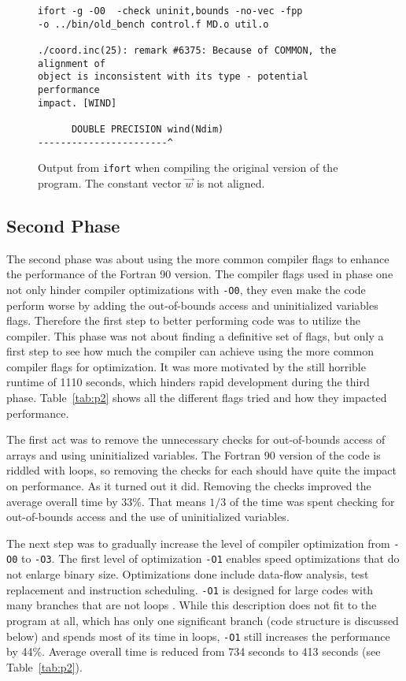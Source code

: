 \documentclass[twoside,11pt]{article}
\begin{document}
\begin{figure}
\begin{verbatim}
ifort -g -O0  -check uninit,bounds -no-vec -fpp
-o ../bin/old_bench control.f MD.o util.o

./coord.inc(25): remark #6375: Because of COMMON, the alignment of
object is inconsistent with its type - potential performance
impact. [WIND]

      DOUBLE PRECISION wind(Ndim)
-----------------------^
\end{verbatim}
\caption{Output from \texttt{ifort} when compiling the original
  version of the program. The constant vector $\vec{w}$ is not
  aligned.}
\label{fig:common_unaligned}
\end{figure}


\subsection{Second Phase} %
\label{subsec:p2}

The second phase was about using the more common compiler flags to
enhance the performance of the Fortran 90 version.
The compiler flags used in phase one not only hinder compiler
optimizations with \texttt{-O0}, they even make the code perform worse
by adding the out-of-bounds access and uninitialized variables flags.
Therefore the first step to better performing code was to utilize the
compiler.
This phase was not about finding a definitive set of flags, but only
a first step to see how much the compiler can achieve using the
more common compiler flags for optimization.
It was more motivated by the still horrible runtime of 1110 seconds,
which hinders rapid development during the third phase.
Table~\ref{tab:p2} shows all the different flags tried and how they
impacted performance.

The first act was to remove the unnecessary checks for out-of-bounds
access of arrays and using uninitialized variables.
The Fortran 90 version of the code is riddled with loops, so removing
the checks for each should have quite the impact on performance.
As it turned out it did.
Removing the checks improved the average overall time by $33\%$.
That means $1/3$ of the time was spent checking for out-of-bounds
access and the use of uninitialized variables.

The next step was to gradually increase the level of compiler
optimization from \texttt{-O0} to \texttt{-O3}.
The first level of optimization \texttt{-O1} enables speed
optimizations that do not enlarge binary size.
Optimizations done include data-flow analysis, test replacement and
instruction scheduling.
\texttt{-O1} is designed for large codes with many branches that
are not loops \citep{o}.
While this description does not fit to the program at all, which
has only one significant branch (code structure is discussed below)
and spends most of its time in loops, \texttt{-O1} still increases
the performance by 44\%.
Average overall time is reduced from 734 seconds to 413 seconds
(see Table~\ref{tab:p2}).
\end{document}
